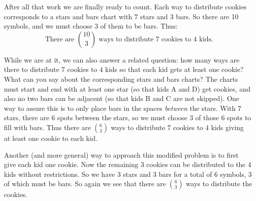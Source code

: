 \documentclass[10pt,]{book}
\theoremstyle{plain}
\theoremstyle{definition}
\theoremstyle{definition}
\theoremstyle{definition}
\numberwithin{equation}{chapter}
\begin{document}
After all that work we are finally ready to count. Each way to distribute cookies corresponds to a stars and bars chart with 7 stars and 3 bars. So there are 10 symbols, and we must choose 3 of them to be bars. Thus:
\begin{equation*}
  \mbox{ There are } {10 \choose 3}\mbox{ ways to distribute 7 cookies to 4 kids.}
\end{equation*}
%
\par

While we are at it, we can also answer a related question: how many ways are there to distribute 7 cookies to 4 kids so that each kid gets at least one cookie? What can you say about the corresponding stars and bars charts? The charts must start and end with at least one star (so that kids A and D) get cookies, and also no two bars can be adjacent (so that kids B and C are not skipped). One way to assure this is to only place bars in the spaces \emph{between} the stars. With 7 stars, there are 6 spots between the stars, so we must choose 3 of those 6 spots to fill with bars. Thus there are \({6 \choose 3}\) ways to distribute 7 cookies to 4 kids giving at least one cookie to each kid.
%
\par

Another (and more general) way to approach this modified problem is to first give each kid one cookie. Now the remaining 3 cookies can be distributed to the 4 kids without restrictions. So we have 3 stars and 3 bars for a total of 6 symbols, 3 of which must be bars. So again we see that there are \({6 \choose 3}\) ways to distribute the cookies.
%
\par
\end{document}
